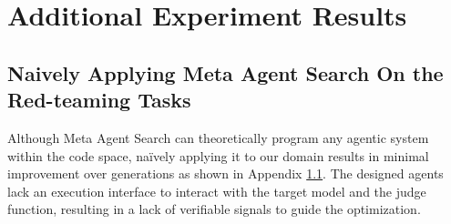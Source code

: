 \clearpage

\section{Additional Experiment Results}
\label{appx: additional results}
\subsection{Naively Applying Meta Agent Search On the Red-teaming Tasks}
\label{appx: naive meta agent search}
Although Meta Agent Search can theoretically program any agentic system within the code space, naïvely applying it to our domain results in minimal improvement over generations as shown in Appendix \ref{appx: naive meta agent search}. The designed agents lack an execution interface to interact with the target model and the judge function, resulting in a lack of verifiable signals to guide the optimization.


